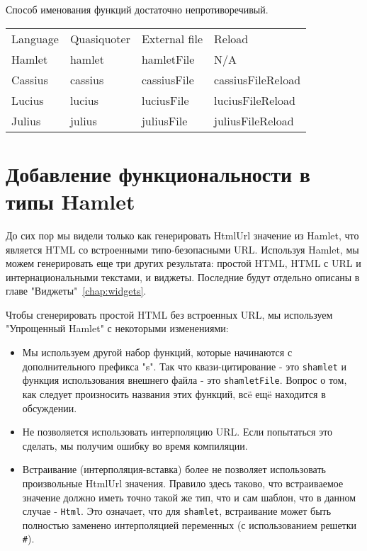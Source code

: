 Способ именования функций достаточно непротиворечивый.
\begin{tabular}{l l l l}
Language & Quasiquoter & External file & Reload \\
Hamlet   & hamlet      & hamletFile    & N/A    \\
Cassius  & cassius     & cassiusFile   & cassiusFileReload \\
Lucius   & lucius      & luciusFile    & luciusFileReload \\
Julius   & julius      & juliusFile    & juliusFileReload \\
\end{tabular}

\section{Добавление функциональности в типы Hamlet}
До сих пор мы видели только как генерировать HtmlUrl значение из
Hamlet, что является HTML со встроенными типо-безопасными
URL. Используя Hamlet, мы можем генерировать еще три других
результата: простой HTML, HTML с URL и интернациональными
текстами, и виджеты.  Последние будут отдельно описаны в главе
"Виджеты"~\ref{chap:widgets}.

Чтобы сгенерировать простой HTML без встроенных URL, мы используем
"Упрощенный Hamlet" с некоторыми изменениями:

\begin{itemize}
    \item Мы используем другой набор функций, которые начинаются с
        дополнительного префикса "s". Так что квази-цитирование - это
        \texttt{shamlet} и функция использования внешнего файла - это
        \texttt{shamletFile}. Вопрос о том, как следует произносить названия
        этих функций, всë ещë находится в обсуждении.
    \item Не позволяется использовать интерполяцию URL. Если попытаться это
        сделать, мы получим ошибку во время компиляции.
    \item Встраивание (интерполяция-вставка) более не позволяет использовать
        произвольные HtmlUrl значения. Правило здесь таково, что встраиваемое
        значение должно иметь точно такой же тип, что и сам шаблон, что в
        данном случае - \lstinline!Html!. Это означает, что для
        \texttt{shamlet}, встраивание может быть полностью заменено
        интерполяцией переменных (с использованием решетки \texttt{\#}).
\end{itemize}

